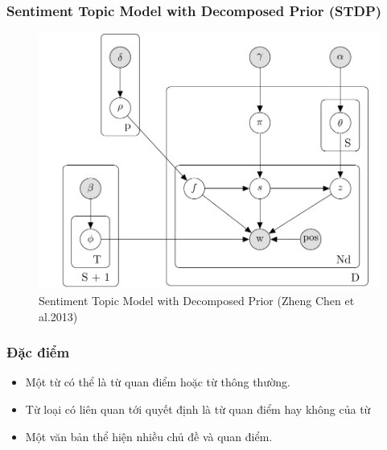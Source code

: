 \documentclass{beamer}
\begin{document}

\begin{frame}
\frametitle{Sentiment Topic Model with Decomposed Prior (STDP) }
\begin{center}
\begin{figure}
\includegraphics[scale=0.2]{Image/STDP.png}
\caption*{Sentiment Topic Model with Decomposed Prior (Zheng Chen et al.2013)}
\end{figure}
\end{center}
\end{frame}


\begin{frame}
\frametitle{Đặc điểm}
\begin{itemize}
\item Một từ có thể là từ quan điểm hoặc từ thông thường.
\item Từ loại có liên quan tới quyết định là từ quan điểm hay không của từ
\item Một văn bản thể hiện nhiều chủ đề và quan điểm.
\end{itemize}
\end{frame}
\end{document}

